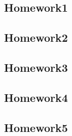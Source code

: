 \documentclass[../main.tex]{subfiles}
\begin{document}
\subsection{Homework1}

\newpage

\subsection{Homework2}

\newpage

\subsection{Homework3}

\newpage

\subsection{Homework4}

\newpage

\subsection{Homework5}

\newpage
\end{document}
